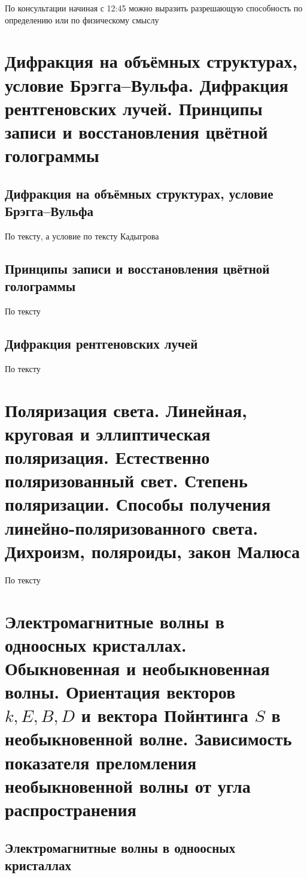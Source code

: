 \documentclass[a4paper, 14pt]{article}
\begin{document}
    По консультации начиная с 12:45 можно выразить разрешающую способность по определению или по физическому смыслу
    
    \section{Дифракция на объёмных структурах, условие Брэгга–Вульфа.
    Дифракция рентгеновских лучей.
    Принципы записи и восстановления цвётной голограммы}
    
    \subsection{Дифракция на объёмных структурах, условие Брэгга–Вульфа}
    
    По тексту, а условие по тексту Кадыгрова
    
    \subsection{Принципы записи и восстановления цвётной голограммы}
    
    По тексту
    
    \subsection{Дифракция рентгеновских лучей}
    
    По тексту
    
    \section{Поляризация света.
    Линейная, круговая и эллиптическая поляризация.
    Естественно поляризованный свет.
    Степень поляризации.
    Способы получения линейно-поляризованного света.
    Дихроизм, поляроиды, закон Малюса}
    
    По тексту
    
    \section{Электромагнитные волны в одноосных кристаллах.
    Обыкновенная и необыкновенная волны.
    Ориентация векторов $k, E, B, D$ и вектора Пойнтинга $S$ в необыкновенной волне.
    Зависимость показателя преломления необыкновенной волны от угла распространения}
    
    \subsection{Электромагнитные волны в одноосных кристаллах}
    
\end{document}
